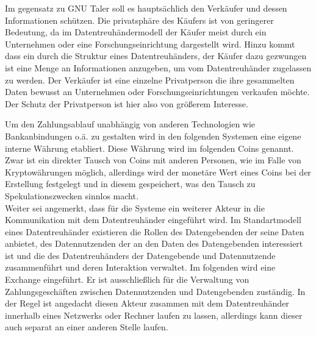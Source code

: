 \documentclass[11pt,a4paper]{scrreprt}
\begin{document}
Im gegensatz zu GNU Taler soll es hauptsächlich den Verkäufer und dessen Informationen schützen. Die privatsphäre des Käufers ist von geringerer Bedeutung, da im Datentreuhändermodell der Käufer meist durch ein Unternehmen oder eine Forschungseinrichtung dargestellt wird. Hinzu kommt dass ein durch die Struktur eines Datentreuhänders, der Käufer dazu gezwungen ist eine Menge an Informationen anzugeben, um vom Datentreuhänder zugelassen zu werden. Der Verkäufer ist eine einzelne Privatperson die ihre gesammelten Daten bewusst an Unternehmen oder Forschungseinrichtungen verkaufen möchte. Der Schutz der Privatperson ist hier also von größerem Interesse.

Um den Zahlungsablauf unabhängig von anderen Technologien wie Bankanbindungen o.ä. zu gestalten wird in den folgenden Systemen eine eigene interne Währung etabliert. Diese Währung wird im folgenden Coins genannt. Zwar ist ein direkter Tausch von Coins mit anderen Personen, wie im Falle von Kryptowährungen möglich, allerdings wird der monetäre Wert eines Coins bei der Erstellung festgelegt und in diesem gespeichert, was den Tausch zu Spekulationszwecken sinnlos macht.\\
Weiter sei angemerkt, dass für die Systeme ein weiterer Akteur in die Kommunikation mit dem Datentreuhänder eingeführt wird. Im Standartmodell eines Datentreuhänder existieren die Rollen des Datengebenden der seine Daten anbietet, des Datennutzenden der an den Daten des Datengebenden interessiert ist und die des Datentreuhänders der Datengebende und Datennutzende zusammenführt und deren Interaktion verwaltet. Im folgenden wird eine Exchange eingeführt. Er ist ausschließlich für die Verwaltung von Zahlungsgeschäften zwischen Datennutzenden und Datengebenden zuständig. In der Regel ist angedacht diesen Akteur zusammen mit dem Datentreuhänder innerhalb eines Netzwerks oder Rechner laufen zu lassen, allerdings kann dieser auch separat an einer anderen Stelle laufen.\\
\end{document}
